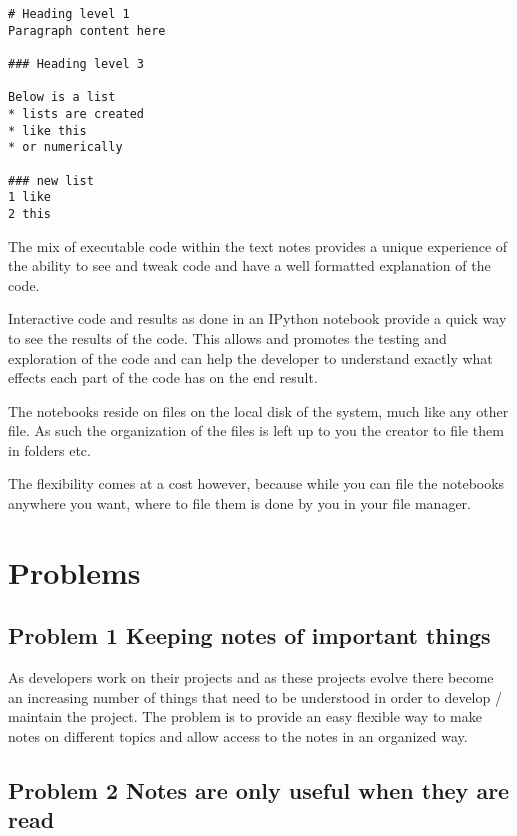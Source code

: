 \begin{verbatim}
# Heading level 1
Paragraph content here

### Heading level 3

Below is a list
* lists are created
* like this
* or numerically

### new list
1 like
2 this
\end{verbatim}

The mix of executable code within the text notes provides a unique
experience of the ability to see and tweak code and have a well
formatted explanation of the code.

Interactive code and results as done in an IPython notebook provide a
quick way to see the results of the code. This allows and promotes the
testing and exploration of the code and can help the developer to
understand exactly what effects each part of the code has on the end
result.

The notebooks reside on files on the local disk of the system, much like
any other file. As such the organization of the files is left up to you
the creator to file them in folders etc.

The flexibility comes at a cost however, because while you can file the
notebooks anywhere you want, where to file them is done by you in your
file manager.

\section{Problems}\label{problems}

\subsection{Problem 1 Keeping notes of important
things}\label{problem-1-keeping-notes-of-important-things}

As developers work on their projects and as these projects evolve there
become an increasing number of things that need to be understood in
order to develop / maintain the project. The problem is to provide an
easy flexible way to make notes on different topics and allow access to
the notes in an organized way.

\subsection{Problem 2 Notes are only useful when they are
read}\label{problem-2-notes-are-only-useful-when-they-are-read}

